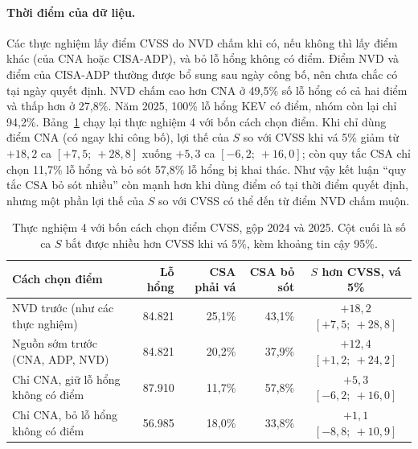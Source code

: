 \paragraph{Thời điểm của dữ liệu.} Các thực nghiệm lấy điểm CVSS do NVD chấm khi có, nếu không
thì lấy điểm khác (của CNA hoặc CISA-ADP), và bỏ lỗ hổng không có điểm. Điểm NVD và điểm của
CISA-ADP thường được bổ sung sau ngày công bố, nên chưa chắc có tại ngày quyết định. NVD chấm cao
hơn CNA ở 49,5\% số lỗ hổng có cả hai điểm và thấp hơn ở 27,8\%. Năm 2025, 100\% lỗ hổng KEV có
điểm, nhóm còn lại chỉ 94,2\%. Bảng~\ref{tab:cvssngayD} chạy lại thực nghiệm 4 với bốn cách chọn
điểm. Khi chỉ dùng điểm CNA (có ngay khi công bố), lợi thế của $S$ so với CVSS khi vá 5\% giảm từ
$+18{,}2$ ca $[+7{,}5;\ +28{,}8]$ xuống $+5{,}3$ ca $[-6{,}2;\ +16{,}0]$; còn quy tắc CSA chỉ chọn
11,7\% lỗ hổng và bỏ sót 57,8\% lỗ hổng bị khai thác. Như vậy kết luận ``quy tắc CSA bỏ sót nhiều''
còn mạnh hơn khi dùng điểm có tại thời điểm quyết định, nhưng một phần lợi thế của $S$ so với CVSS
có thể đến từ điểm NVD chấm muộn.

\begin{table}
\centering
\caption{Thực nghiệm 4 với bốn cách chọn điểm CVSS, gộp 2024 và 2025. Cột cuối là số ca $S$ bắt
được nhiều hơn CVSS khi vá 5\%, kèm khoảng tin cậy 95\%.}\label{tab:cvssngayD}
\begin{tabular}{lrrrc}
\toprule
Cách chọn điểm & Lỗ hổng & CSA phải vá & CSA bỏ sót & $S$ hơn CVSS, vá 5\% \\
\midrule
NVD trước (như các thực nghiệm) & 84.821 & 25,1\% & 43,1\% & $+18{,}2$ $[+7{,}5;\ +28{,}8]$ \\
Nguồn sớm trước (CNA, ADP, NVD) & 84.821 & 20,2\% & 37,9\% & $+12{,}4$ $[+1{,}2;\ +24{,}2]$ \\
Chỉ CNA, giữ lỗ hổng không có điểm & 87.910 & 11,7\% & 57,8\% & $+5{,}3$ $[-6{,}2;\ +16{,}0]$ \\
Chỉ CNA, bỏ lỗ hổng không có điểm & 56.985 & 18,0\% & 33,8\% & $+1{,}1$ $[-8{,}8;\ +10{,}9]$ \\
\bottomrule
\end{tabular}
\end{table}
